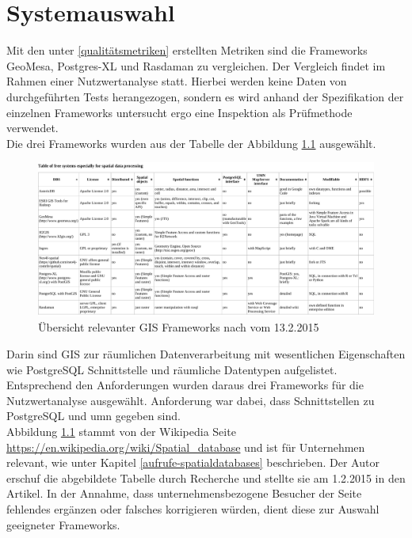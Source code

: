 \chapter{Systemauswahl}
Mit den unter \ref{qualitätsmetriken} erstellten Metriken sind die Frameworks GeoMesa, Postgres-XL und Rasdaman zu vergleichen.
Der Vergleich findet im Rahmen einer Nutzwertanalyse statt.
Hierbei werden keine Daten von durchgeführten Tests herangezogen, sondern es wird anhand der Spezifikation der einzelnen Frameworks untersucht ergo eine Inspektion als Prüfmethode verwendet.\\
%
Die drei Frameworks wurden aus der Tabelle der Abbildung \ref{fig:spatialdatabases} ausgewählt.
\begin{figure}
\centering
\includegraphics[angle=90,width=.66\textwidth]{Abbildungen/table_spatialdatabases_13_2_15.pdf}
\caption[Übersicht relevanter GIS Frameworks]{Übersicht relevanter GIS Frameworks nach \cite{website:wiki-spatialdatabase} vom 13.2.2015}
\label{fig:spatialdatabases}
\end{figure}
Darin sind GIS zur räumlichen Datenverarbeitung mit wesentlichen Eigenschaften wie \mbox{PostgreSQL} Schnittstelle und räumliche Datentypen aufgelistet.
Entsprechend den Anforderungen wurden daraus drei Frameworks für die Nutzwertanalyse ausgewählt.
Anforderung war dabei, dass Schnittstellen zu PostgreSQL und \Gls{umn} gegeben sind.\\
Abbildung \ref{fig:spatialdatabases} stammt von der Wikipedia Seite \url{https://en.wikipedia.org/wiki/Spatial_database} und ist für Unternehmen relevant, wie unter Kapitel \ref{aufrufe-spatialdatabases} beschrieben.
Der Autor erschuf die abgebildete Tabelle durch Recherche und stellte sie am 1.2.2015 in den Artikel.
In der Annahme, dass unternehmensbezogene Besucher der Seite fehlendes ergänzen oder falsches korrigieren würden, dient diese zur Auswahl geeigneter Frameworks.


